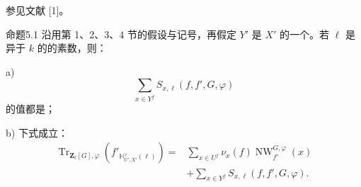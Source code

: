 参见文献 [1]。
\begin{SGAresult}{命题}{5.1}
沿用第 1、2、3、4 节的假设与记号，再假定 $Y'$ 是 $X'$ 的一个。若 $\ell$ 是异于 $k$ 的的素数，则：

\textup{a)} 
\[
\sum_{x\in Y^f}S_{x,\ell}(f,f',G,\varphi)
\]
的值都是；

\textup{b)} 下式成立：
\[
\begin{aligned}
\operatorname{Tr}_{\mathbf Z_\ell[G],\varphi}
 (f'_{\mathbb H_{U',X'}^\vee(\ell)})
={}&\sum_{x\in U^f}\nu_x(f)\operatorname{NW}_{f'}^{G,\varphi}(x)\\
&+\sum_{x\in Y^f}S_{x,\ell}(f,f',G,\varphi).
\end{aligned}
\tag{5.1.1}
\]
\end{SGAresult}
